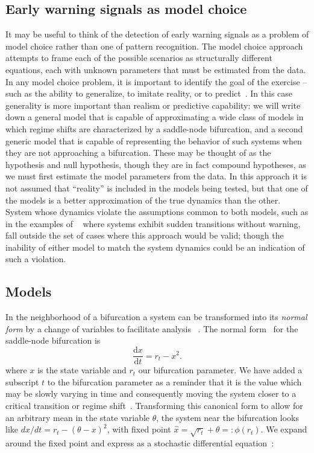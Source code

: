 \documentclass[authoryear,review,11pt]{elsarticle}
\newcommand{\ud}{\mathrm{d}}
\begin{document}
\subsection*{Early warning signals as model choice}
It may be useful to think of the detection of early warning signals
as a problem of model choice rather than one of pattern recognition.
The model choice approach attempts to frame each of the possible scenarios as structurally different equations,
each with unknown parameters that must be estimated from the data.
In any model choice problem, it is important to identify the goal of the exercise --
such as the ability to generalize, to imitate reality, or to predict~\citep{Levins1966}.
In this case generality is more important than realism or predictive capability:
we will write down a general model that is capable of approximating
a wide class of models in which regime shifts are characterized by a saddle-node bifurcation,
and a second generic model that is capable of representing the behavior of such systems
when they are not approaching a bifurcation.
These may be thought of as the hypothesis and null hypothesis,
though they are in fact compound hypotheses,
as we must first estimate the model parameters from the data.
In this approach it is not assumed that ``reality'' is included in the models being tested,
but that one of the models is a better approximation of the true dynamics than the other.
System whose dynamics violate the assumptions common to both models,
such as in the examples of ~\citet{Hastings2010} where systems exhibit sudden transitions without warning,
fall outside the set of cases where this approach would be valid;
though the inability of either model to match the system dynamics could be an indication of such a violation.


\subsection*{Models}
In the neighborhood of a bifurcation a system can be transformed into its \emph{normal form}
by a change of variables to facilitate analysis ~\citep{Guckenheimer1983}.
The normal form~\citep{Guckenheimer1983, Kuehn2011} for the saddle-node bifurcation is
\begin{equation}
\frac{\ud x}{\ud t} = r_t- x^2.
\label{saddle-node}
\end{equation}
where $x$ is the state variable and $r_t$ our bifurcation parameter.
We have added a subscript $t$ to the bifurcation parameter as a reminder that
it is the value which may be slowly varying in time and
consequently moving the system closer to a critical transition or regime shift~\citep{Scheffer2009}.
Transforming this canonical form to allow for an arbitrary mean in the state variable $\theta$,
the system near the bifurcation looks like \( dx/dt = r_t- (\theta-x)^2 \), with fixed point \(\hat x = \sqrt{r_t} +\theta =: \phi(r_t)\).
We expand around the fixed point and express as a stochastic differential equation~\citep[\emph{e.g.}][]{Gardiner2009}:
\end{document}
